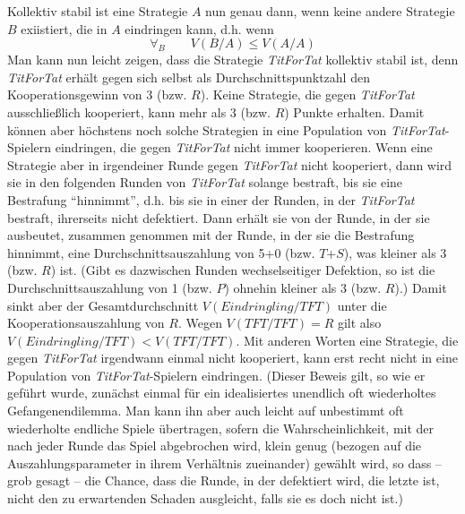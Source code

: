 Kollektiv stabil ist eine Strategie $A$ nun genau dann, wenn keine andere
Strategie $B$ exiistiert, die in $A$ eindringen kann, d.h. wenn
\[ \forall_B \qquad V(B/A) \leq V(A/A) \]
Man kann nun leicht zeigen, dass die Strategie {\em TitForTat} kollektiv stabil
ist, denn {\em TitForTat} erhält gegen sich selbst als Durchschnittspunktzahl
den Kooperationsgewinn von 3 (bzw. $R$). Keine Strategie, die gegen {\em
TitForTat} ausschließlich kooperiert, kann mehr als 3 (bzw. $R$) Punkte
erhalten. Damit können aber höchstens noch solche Strategien in eine Population
von {\em TitForTat}-Spielern eindringen, die gegen {\em TitForTat} nicht immer
kooperieren. Wenn eine Strategie aber in irgendeiner Runde gegen {\em
TitForTat} nicht kooperiert, dann wird sie in den folgenden Runden von {\em
TitForTat} solange bestraft, bis sie eine Bestrafung "`hinnimmt"', d.h. bis
sie in einer der Runden, in der {\em TitForTat} bestraft, ihrerseits nicht
defektiert. Dann erhält sie von der Runde, in der sie ausbeutet, zusammen
genommen mit der Runde, in der sie die Bestrafung hinnimmt, eine
Durchschnittsauszahlung von 5+0 (bzw. $T$+$S$), was kleiner als 3 (bzw. $R$)
ist. (Gibt es dazwischen Runden wechselseitiger Defektion, so ist die
Durchschnittsauszahlung von 1 (bzw. $P$) ohnehin kleiner als 3 (bzw. $R$).)
Damit sinkt aber der Gesamtdurchschnitt $V(Eindringling/TFT)$ unter die
Kooperationsauszahlung von $R$. Wegen $V(TFT/TFT) = R$ gilt also
$V(Eindringling/TFT) < V(TFT/TFT)$. Mit anderen Worten eine Strategie, die
gegen {\em TitForTat} irgendwann einmal nicht kooperiert, kann erst recht nicht
in eine Population von {\em TitForTat}-Spielern eindringen. (Dieser Beweis
gilt, so wie er geführt wurde, zunächst einmal für ein idealisiertes unendlich
oft wiederholtes Gefangenendilemma. Man kann ihn
aber auch leicht auf unbestimmt oft wiederholte endliche Spiele übertragen, 
sofern die Wahrscheinlichkeit, mit der nach jeder Runde das Spiel abgebrochen
wird, klein genug (bezogen auf die Auszahlungsparameter in ihrem Verhältnis
zueinander) gewählt wird, so dass -- grob gesagt -- die Chance, dass die Runde,
in der defektiert wird, die letzte ist, nicht den zu erwartenden Schaden ausgleicht, 
falls sie es doch nicht ist.)

